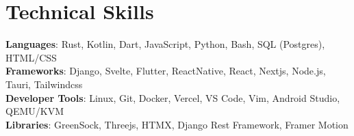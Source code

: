 \documentclass[letterpaper,11pt]{article}
\begin{document}
\section{Technical Skills}
 \begin{itemize}[leftmargin=0.15in, label={}]
    \small{\item{
     \textbf{Languages}{: Rust, Kotlin, Dart, JavaScript, Python, Bash, SQL (Postgres), HTML/CSS} \\
     \textbf{Frameworks}{: Django, Svelte, Flutter, ReactNative, React, Nextjs, Node.js, Tauri, Tailwindcss} \\
     \textbf{Developer Tools}{: Linux, Git, Docker, Vercel, VS Code, Vim, Android Studio, QEMU/KVM} \\
     \textbf{Libraries}{: GreenSock, Threejs, HTMX, Django Rest Framework, Framer Motion} \\
    }}
 \end{itemize}


\end{document}
